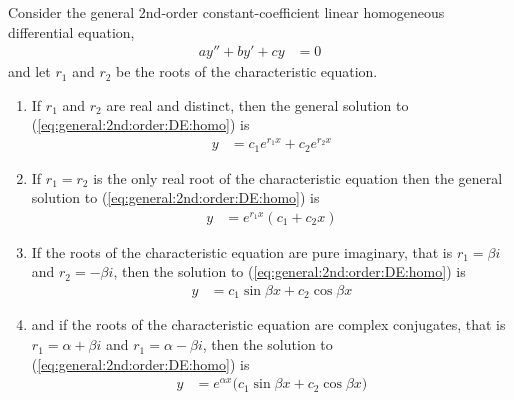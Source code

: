 \begin{lemma} \label{lem:soln:2nd:order:DE:homo}
Consider the general 2nd-order constant-coefficient linear homogeneous differential equation, 
%
\begin{align} \label{eq:general:2nd:order:DE:homo}
a y'' + b y' + c y & = 0
\end{align}
and let $r_1$ and $r_2$ be the roots of the characteristic equation.  
\begin{enumerate}
\item If $r_1$ and $r_2$ are real and distinct, then the general solution to (\ref{eq:general:2nd:order:DE:homo}) is
%
\begin{align} \label{eq:soln:2nd:order:DE:homo:eq1}
y & = c_1 e^{r_1 x} + c_2 e^{r_2 x} 
\end{align}
\item If $r_1=r_2$ is the only real root of the characteristic equation then the general solution to (\ref{eq:general:2nd:order:DE:homo}) is
%
\begin{align} \label{eq:soln:2nd:order:DE:homo:eq2}
y & = e^{r_1 x} (c_1 + c_2 x ) 
\end{align}
\item If the roots of the characteristic equation are pure imaginary, that is $r_1=\beta i$ and $r_2=-\beta i$, then the solution to (\ref{eq:general:2nd:order:DE:homo}) is
%
\begin{align} \label{eq:soln:2nd:order:DE:homo:eq3}
y & = c_1 \sin \beta x + c_2 \cos \beta x
\end{align}
\item and if the roots of the characteristic equation are complex conjugates, that is $r_1=\alpha + \beta i $ and $r_1=\alpha - \beta i $, then the solution to (\ref{eq:general:2nd:order:DE:homo}) is
%
\begin{align} \label{eq:soln:2nd:order:DE:homo:eq4}
y & = e^{\alpha x} \bigl( c_1 \sin \beta x + c_2 \cos \beta x) 
\end{align}
\end{enumerate}
\end{lemma}

